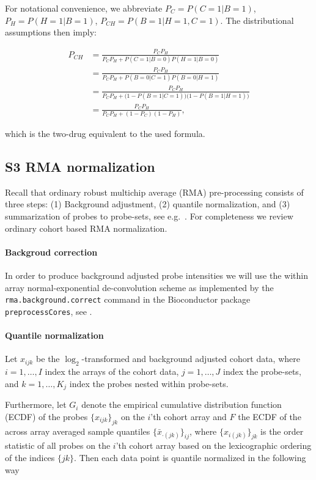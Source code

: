 \documentclass[10pt,letterpaper]{article}
\begin{document}
For notational convenience, we abbreviate $P_C = P(C=1 | B=1)$, $P_H = P(H=1 | B=1)$, $P_{CH} = P(B=1 | H=1, C=1)$. The distributional assumptions then imply:

\begin{align*}
  P_{CH}
  &= \frac{P_C P_H}
          {P_C P_H + P(C=1 | B=0) P(H=1 | B=0)}
  \\
  &= \frac{P_C P_H}
          {P_C P_H + P(B=0 | C=1) P(B=0 | H=1)}
  \\
  &= \frac{P_C P_H}
          {P_C P_H + \bigl(1 - P(B=1 | C=1)\bigr)\bigl(1 - P(B=1 | H=1)\bigr)}
  \\
  &= \frac{P_C P_H}
          {P_C P_H + (1 - P_C)(1 - P_H)},
\end{align*}

which is the two-drug equivalent to the used formula.

\subsection*{S3 RMA normalization}
Recall that ordinary robust multichip average (RMA) pre-processing consists of three steps: (1) Background adjustment, (2) quantile normalization, and (3) summarization of probes to probe-sets, see e.g.\ \cite{Irizarry2003, Irizarry2003b}. For completeness we review ordinary cohort based RMA normalization.

\paragraph{Backgroud correction}
In order to produce background adjusted probe intensities we will use the within array normal-exponential de-convolution scheme as implemented by the \texttt{rma.background.correct} command in the Bioconductor package \texttt{preprocessCores}, see
\cite{Irizarry2003b,Bolstad2004}.


\paragraph{Quantile normalization}
Let $x_{ijk}$ be the $\log_2$-transformed and background adjusted cohort data, where $i = 1,\dots,I$ index the arrays of the cohort data, $j=1,\dots,J$  index the probe-sets, and $k=1,\dots,K_j$ index the probes nested within probe-sets.

Furthermore, let $G_i$ denote the empirical cumulative distribution function (ECDF) of the probes $\{x_{ijk}\}_{jk}$ on the $i$'th cohort array and $F$ the ECDF of the across array averaged sample quantiles $\{\bar{x}_{\cdot (jk)}\}_{ij}$, where $\{x_{i(jk)}\}_{jk}$ is the order statistic of all probes on the $i$'th cohort array based on the lexicographic ordering of the indices $\{jk\}$. Then each data point is quantile normalized in the following way
\end{document}
